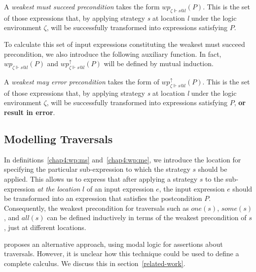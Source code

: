 \begin{definition}
A \emph{weakest must succeed precondition} takes the form $wp_{\zeta \Vdash s@l}(P)$.
This is the set of those expressions that, by applying strategy \textit{s} at location \textit{l}
under the logic environment $\zeta$, will be successfully transformed into expressions satisfying $P$.
\label{chap4:wp:ms}
\end{definition}
To calculate this set of input expressions constituting the weakest must succeed precondition, we also introduce
the following auxiliary function. In fact, $wp_{\zeta \Vdash s@l}(P)$ and $wp_{\zeta \Vdash s@l}^\uparrow(P)$
will be defined by mutual induction.
\begin{definition}
A \emph{weakest may error precondition} takes the form of $wp_{\zeta \Vdash s@l}^\uparrow(P)$.
This is the set of those expressions that, by applying strategy \textit{s} at location \textit{l}
under the logic environment $\zeta$, will be successfully transformed into expressions satisfying $P$, \textbf{or result in error}.
\label{chap4:wp:me}
\end{definition}

\subsection{Modelling Traversals}
\label{chap4:wp:design}
In definitions~\ref{chap4:wp:ms} and~\ref{chap4:wp:me}, we introduce the location for specifying the particular sub-expression to which the strategy $s$ should be applied. This allows us to express that after applying a strategy $s$ to the sub-expression \emph{at the location} $l$ of an input expression $e$, the input expression $e$ should be transformed into an expression that satisfies the postcondition $P$.
Consequently, the weakest precondition for traversals such as $\mathit{one}(s)$, $\mathit{some}(s)$, and $\mathit{all}(s)$ can be defined inductively in terms of the weakest precondition of $s$, just at different locations.

\citet{KIEBURTZ2001138} proposes an alternative approach, using modal logic for assertions about traversals. However, it is unclear how this technique could be used to define a complete calculus. We discuss this in section~\ref{related-work}.

